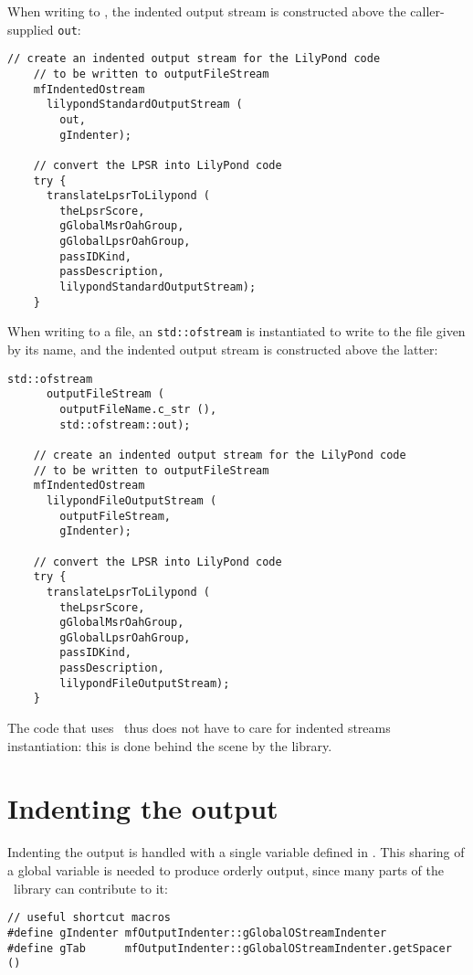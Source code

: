 When writing to \standardOutput, the indented output stream is constructed above the caller-supplied {\tt out}:
\begin{lstlisting}[language=CPlusPlus]
    // create an indented output stream for the LilyPond code
    // to be written to outputFileStream
    mfIndentedOstream
      lilypondStandardOutputStream (
        out,
        gIndenter);

    // convert the LPSR into LilyPond code
    try {
      translateLpsrToLilypond (
        theLpsrScore,
        gGlobalMsrOahGroup,
        gGlobalLpsrOahGroup,
        passIDKind,
        passDescription,
        lilypondStandardOutputStream);
    }
\end{lstlisting}

When writing to a file, an {\tt std::ofstream} is instantiated to write to the file given by its name, and the indented output stream is constructed above the latter:
\begin{lstlisting}[language=CPlusPlus]
     std::ofstream
      outputFileStream (
        outputFileName.c_str (),
        std::ofstream::out);

    // create an indented output stream for the LilyPond code
    // to be written to outputFileStream
    mfIndentedOstream
      lilypondFileOutputStream (
        outputFileStream,
        gIndenter);

    // convert the LPSR into LilyPond code
    try {
      translateLpsrToLilypond (
        theLpsrScore,
        gGlobalMsrOahGroup,
        gGlobalLpsrOahGroup,
        passIDKind,
        passDescription,
        lilypondFileOutputStream);
    }
\end{lstlisting}

The code that uses \mf\ thus does not have to care for indented streams instantiation: this is done behind the scene by the library.


\section{Indenting the output}

Indenting the output is handled with a single variable defined in .
This sharing of a global variable is needed to produce orderly output, since many parts of the \mf\ library can contribute to it:
\begin{lstlisting}[language=CPlusPlus]
// useful shortcut macros
#define gIndenter mfOutputIndenter::gGlobalOStreamIndenter
#define gTab      mfOutputIndenter::gGlobalOStreamIndenter.getSpacer ()
\end{lstlisting}

